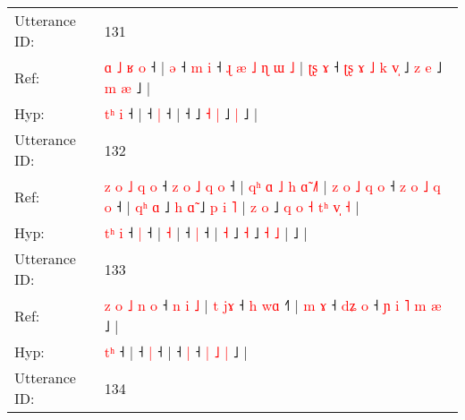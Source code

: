 \documentclass[10pt]{article}
\DeclareRobustCommand{\hl}[1]{{\textcolor{red}{#1}}}
\begin{document}
\begin{longtable}{ll}
 \\
\midrule
Utterance ID: & 131 \\
Ref: & \hl{ɑ}\hl{ }\hl{˩}\hl{ }\hl{ʁ} \hl{o} ˧ |\hl{ }\hl{ə} ˧\hl{ }\hl{m} \hl{i} ˧\hl{ }\hl{ɻ}\hl{ }\hl{æ}\hl{ }\hl{˩}\hl{ }\hl{ɳ}\hl{ }\hl{ɯ}\hl{ }\hl{˩} |\hl{ }\hl{ʈ}\hl{ʂ}\hl{ }\hl{ɤ} ˧\hl{ }\hl{ʈ}\hl{ʂ}\hl{ }\hl{ɤ}\hl{ }\hl{˩}\hl{ }\hl{k}\hl{ }\hl{v}\hl{̩} ˩ \hl{z} \hl{e} ˩\hl{ }\hl{m} \hl{æ} ˩ |
 \\
Hyp: & \hl{}\hl{}\hl{}\hl{t}\hl{ʰ} \hl{i} ˧ |\hl{}\hl{} ˧\hl{}\hl{} \hl{|} ˧\hl{}\hl{}\hl{}\hl{}\hl{}\hl{}\hl{}\hl{}\hl{}\hl{}\hl{}\hl{} |\hl{}\hl{}\hl{}\hl{}\hl{} ˧\hl{}\hl{}\hl{}\hl{}\hl{}\hl{}\hl{}\hl{}\hl{}\hl{}\hl{}\hl{} ˩ \hl{˧} \hl{|} ˩\hl{}\hl{} \hl{|} ˩ |
 \\
\midrule
Utterance ID: & 132 \\
Ref: & \hl{z}\hl{ }\hl{o}\hl{ }\hl{˩}\hl{ }\hl{q} \hl{o} ˧\hl{ }\hl{z}\hl{ }\hl{o}\hl{ }\hl{˩}\hl{ }\hl{q} \hl{o} ˧ |\hl{ }\hl{q}\hl{ʰ}\hl{ }\hl{ɑ}\hl{ }\hl{˩}\hl{ }\hl{h}\hl{ }\hl{ɑ}\hl{̃} \hl{˩}\hl{˥} |\hl{ }\hl{z}\hl{ }\hl{o}\hl{ }\hl{˩}\hl{ }\hl{q}\hl{ }\hl{o} ˧\hl{ }\hl{z}\hl{ }\hl{o}\hl{ }\hl{˩}\hl{ }\hl{q} \hl{o} ˧ |\hl{ }\hl{q}\hl{ʰ} \hl{ɑ} ˩\hl{ }\hl{h} \hl{ɑ}\hl{̃} ˩\hl{ }\hl{p} \hl{i} \hl{˥} |\hl{ }\hl{z}\hl{ }\hl{o} ˩\hl{ }\hl{q}\hl{ }\hl{o}\hl{ }\hl{˧}\hl{ }\hl{t}\hl{ʰ}\hl{ }\hl{v}\hl{̩}\hl{ }\hl{˧} |
 \\
Hyp: & \hl{}\hl{}\hl{}\hl{}\hl{}\hl{t}\hl{ʰ} \hl{i} ˧\hl{}\hl{}\hl{}\hl{}\hl{}\hl{}\hl{}\hl{} \hl{|} ˧ |\hl{}\hl{}\hl{}\hl{}\hl{}\hl{}\hl{}\hl{}\hl{}\hl{}\hl{}\hl{} \hl{}\hl{˧} |\hl{}\hl{}\hl{}\hl{}\hl{}\hl{}\hl{}\hl{}\hl{}\hl{} ˧\hl{}\hl{}\hl{}\hl{}\hl{}\hl{}\hl{}\hl{} \hl{|} ˧ |\hl{}\hl{}\hl{} \hl{˧} ˩\hl{}\hl{} \hl{}\hl{˧} ˩\hl{}\hl{} \hl{˧} \hl{˩} |\hl{}\hl{}\hl{}\hl{} ˩\hl{}\hl{}\hl{}\hl{}\hl{}\hl{}\hl{}\hl{}\hl{}\hl{}\hl{}\hl{}\hl{}\hl{} |
 \\
\midrule
Utterance ID: & 133 \\
Ref: & \hl{z}\hl{ }\hl{o}\hl{ }\hl{˩}\hl{ }\hl{n}\hl{ }\hl{o} ˧\hl{ }\hl{n}\hl{ }\hl{i}\hl{ }\hl{˩} |\hl{ }\hl{t}\hl{ }\hl{j}\hl{ɤ} ˧\hl{ }\hl{h} \hl{w}\hl{ɑ} ˧\hl{˥} |\hl{ }\hl{m}\hl{ }\hl{ɤ} ˧\hl{ }\hl{d}\hl{ʑ} \hl{o} ˧\hl{ }\hl{ɲ}\hl{ }\hl{i} \hl{˥} \hl{m} \hl{æ} ˩ |
 \\
Hyp: & \hl{}\hl{}\hl{}\hl{}\hl{}\hl{}\hl{}\hl{t}\hl{ʰ} ˧\hl{}\hl{}\hl{}\hl{}\hl{}\hl{} |\hl{}\hl{}\hl{}\hl{}\hl{} ˧\hl{}\hl{} \hl{}\hl{|} ˧\hl{} |\hl{}\hl{}\hl{}\hl{} ˧\hl{}\hl{}\hl{} \hl{|} ˧\hl{}\hl{}\hl{}\hl{} \hl{|} \hl{˩} \hl{|} ˩ |
 \\
\midrule
Utterance ID: & 134 \\

\end{longtable}
\end{document}
